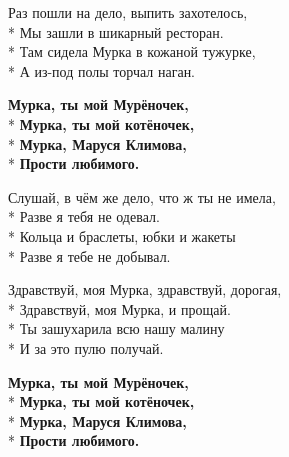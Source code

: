 \medskip

\begin{minipage}{\linewidth}
Раз пошли на дело, выпить захотелось,\\*
Мы зашли в шикарный ресторан.\\*
Там сидела Мурка в кожаной тужурке,\\*
А из-под полы торчал наган.\\
\end{minipage}\par\medskip\nobreak

\medskip

\begin{minipage}{\linewidth}
\hspace*{1.5em}\textbf{Мурка, ты мой Мурёночек,}\\*
\hspace*{1.5em}\textbf{Мурка, ты мой котёночек, }\\*
\hspace*{1.5em}\textbf{Мурка, Маруся Климова,}\\*
\hspace*{1.5em}\textbf{Прости любимого.}\\
\end{minipage}\par\medskip\nobreak

\medskip

\begin{minipage}{\linewidth}
Слушай, в чём же дело, что ж ты не имела,\\*
Разве я тебя не одевал.\\*
Кольца и браслеты, юбки и жакеты\\*
Разве я тебе не добывал.\\
\end{minipage}\par\medskip\nobreak

\medskip

\begin{minipage}{\linewidth}
Здравствуй, моя Мурка, здравствуй, дорогая,\\*
Здравствуй, моя Мурка, и прощай.\\*
Ты зашухарила всю нашу малину\\*
И за это пулю получай.\\
\end{minipage}\par\medskip\nobreak

\medskip

\begin{minipage}{\linewidth}
\hspace*{1.5em}\textbf{Мурка, ты мой Мурёночек,}\\*
\hspace*{1.5em}\textbf{Мурка, ты мой котёночек, }\\*
\hspace*{1.5em}\textbf{Мурка, Маруся Климова,}\\*
\hspace*{1.5em}\textbf{Прости любимого.}\\
\end{minipage}

